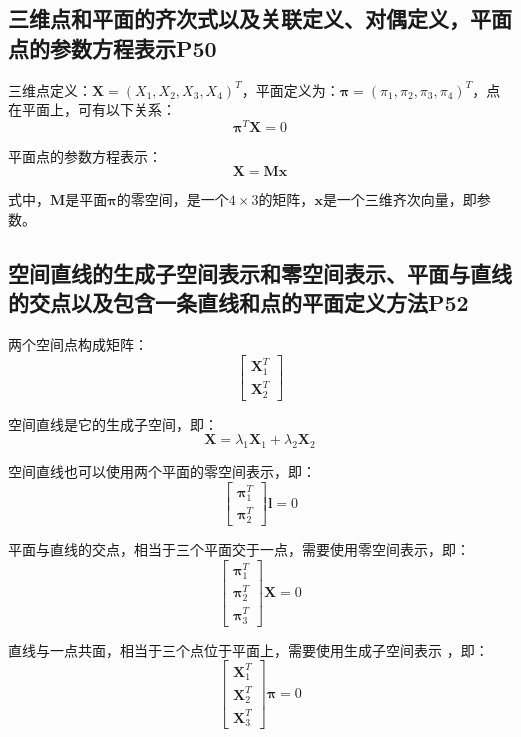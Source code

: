 \documentclass[11pt]{article}
\begin{document}
\subsection{三维点和平面的齐次式以及关联定义、对偶定义，平面点的参数方程表示P50}
三维点定义：$\mathbold{X}=(X_1,X_2,X_3,X_4)^T$，平面定义为：$\mathbold{\pi}=(\pi_1,\pi_2,\pi_3,\pi_4)^T$，点在平面上，可有以下关系：
\begin{equation*}
  \mathbold{\pi}^T\mathbold{X}=0
\end{equation*}\par
平面点的参数方程表示：
\begin{equation*}
  \mathbold{X}=\mathbold{Mx}
\end{equation*}\par
式中，$\mathbold{M}$是平面$\mathbold{\pi}$的零空间，是一个$4\times3$的矩阵，$\mathbold{x}$是一个三维齐次向量，即参数。
\subsection{	空间直线的生成子空间表示和零空间表示、平面与直线的交点以及包含一条直线和点的平面定义方法P52}
两个空间点构成矩阵：
\begin{equation*}
  \begin{bmatrix}
    \mathbold{X}_1^T \\
    \mathbold{X}_2^T
  \end{bmatrix}
\end{equation*}\par
空间直线是它的生成子空间，即：
\begin{equation*}
  \mathbold{X}=\lambda_1\mathbold{X}_1+\lambda_2\mathbold{X}_2
\end{equation*}\par
空间直线也可以使用两个平面的零空间表示，即：
\begin{equation*}
  \begin{bmatrix}
    \mathbold{\pi}_1^T \\
    \mathbold{\pi}_2^T
  \end{bmatrix} \mathbold{l}=0
\end{equation*}\par
平面与直线的交点，相当于三个平面交于一点，需要使用零空间表示，即：
\begin{equation*}
  \begin{bmatrix}
    \mathbold{\pi}_1^T \\
    \mathbold{\pi}_2^T \\
    \mathbold{\pi}_3^T
  \end{bmatrix} \mathbold{X}=0
\end{equation*}\par
直线与一点共面，相当于三个点位于平面上，需要使用生成子空间表示 ，即：
\begin{equation*}
  \begin{bmatrix}
    \mathbold{X}_1^T \\
    \mathbold{X}_2^T \\
    \mathbold{X}_3^T
  \end{bmatrix} \mathbold{\pi}=0
\end{equation*}\par
\end{document}

